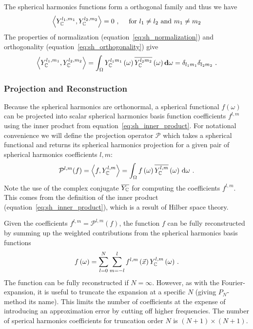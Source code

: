 The spherical harmonics functions form a orthogonal family and thus we have
\begin{align}
\left<Y_{\mathbb{C}}^{l_1, m_1},Y_{\mathbb{C}}^{l_2, m_2}\right>
=
0
\ ,\quad\text{ for } l_1 \ne l_2 \text{ and } m_1 \ne m_2
\end{align}
The properties of normalization (equation~\ref{eq:sh_normalization}) and orthogonality (equation~\ref{eq:sh_orthogonality}) give
\begin{align}
\label{eq:sh_orthogonality}
\left<Y_{\mathbb{C}}^{l_1, m_1},Y_{\mathbb{C}}^{l_2, m_2}\right>=
\int_{\Omega} Y_{\mathbb{C}}^{l_1m_1}\left(\omega\right) \overline{Y_{\mathbb{C}}^{l_2m_2}}\left(\omega\right) \mathbf{d}\omega = \delta_{l_1m_1}\delta_{l_2m_2}
\ .
\end{align}

\subsubsection*{Projection and Reconstruction}

Because the spherical harmonics are orthonormal, a spherical functional $f\left(\omega\right)$ can be projected into scalar spherical harmonics basis function coefficients $f^{l,m}$ using the inner product from equation~\ref{eq:sh_inner_product}. For notational convenience we will define the projection operator $\mathcal{P}$ which takes a spherical functional and returns its spherical harmonics projection for a given pair of spherical harmonics coefficients $l,m$:
\begin{align}
\label{eq:sh_projection}
\mathcal{P}^{l, m}(f) =  \left<f,Y_{\mathbb{C}}^{l, m}\right> = 
\int_\Omega f\left(\omega\right)\overline{Y_{\mathbb{C}}^{l,m}}\left(\omega\right)\,\mathrm{d}\omega
\ .
\end{align}
Note the use of the complex conjugate $\overline{Y_{\mathbb{C}}}$ for computing the coefficients $f^{l,m}$. This comes from the definition of the inner product (equation~\ref{eq:sh_inner_product}), which is a result of Hilber space theory. 

Given the coefficients $f^{l, m} = \mathcal{P}^{l, m}(f)$, the function $f$ can be fully reconstructed by summing up the weighted contributions from the spherical harmonics basis functions
\begin{align}
\label{eq:sh_reconstruction}
f\left(\omega\right) = 
\sum_{l=0}^{N}
{
\sum_{m=-l}^{l}
{
f^{l,m}\left(\vec{x}\right)Y_{\mathbb{C}}^{l,m}\left(\omega\right)
}
}
\ .
\end{align}
The function can be fully reconstructed if $N=\infty$. However, as with the Fourier-expansion, it is useful to truncate the expansion at a specific $N$ (giving $P_N$-method its name). This limits the number of coefficients at the expense of introducing an approximation error by cutting off higher frequencies. The number of sperical harmonics coefficients for truncation order $N$ is $(N+1)\times(N+1)$.

